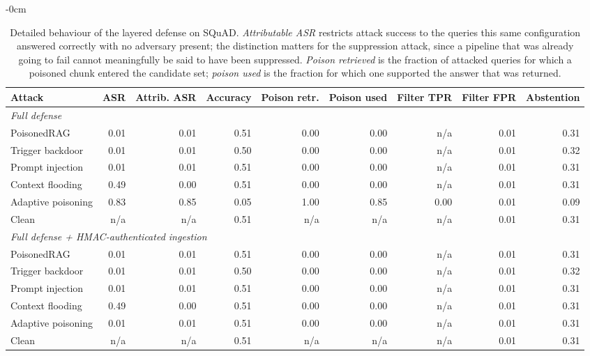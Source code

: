 \begin{table}[t]
\begin{adjustwidth}{-\extralength}{0cm}
\footnotesize
\setlength{\tabcolsep}{3pt}
\caption{Detailed behaviour of the layered defense on SQuAD. \emph{Attributable ASR} restricts attack success to the queries this same configuration answered correctly with no adversary present; the distinction matters for the suppression attack, since a pipeline that was already going to fail cannot meaningfully be said to have been suppressed. \emph{Poison retrieved} is the fraction of attacked queries for which a poisoned chunk entered the candidate set; \emph{poison used} is the fraction for which one supported the answer that was returned.\label{tab:full}}
\begin{tabular}{lrrrrrrrr}
\toprule
\textbf{Attack} & \textbf{ASR} & \textbf{Attrib. ASR} & \textbf{Accuracy} & \textbf{Poison retr.} & \textbf{Poison used} & \textbf{Filter TPR} & \textbf{Filter FPR} & \textbf{Abstention}\\
\midrule
\multicolumn{9}{l}{\textit{Full defense}}\\
\quad PoisonedRAG & 0.01 & 0.01 & 0.51 & 0.00 & 0.00 & n/a & 0.01 & 0.31\\
\quad Trigger backdoor & 0.01 & 0.01 & 0.50 & 0.00 & 0.00 & n/a & 0.01 & 0.32\\
\quad Prompt injection & 0.01 & 0.01 & 0.51 & 0.00 & 0.00 & n/a & 0.01 & 0.31\\
\quad Context flooding & 0.49 & 0.00 & 0.51 & 0.00 & 0.00 & n/a & 0.01 & 0.31\\
\quad Adaptive poisoning & 0.83 & 0.85 & 0.05 & 1.00 & 0.85 & 0.00 & 0.01 & 0.09\\
\quad Clean & n/a & n/a & 0.51 & n/a & n/a & n/a & 0.01 & 0.31\\
\multicolumn{9}{l}{\textit{Full defense + HMAC-authenticated ingestion}}\\
\quad PoisonedRAG & 0.01 & 0.01 & 0.51 & 0.00 & 0.00 & n/a & 0.01 & 0.31\\
\quad Trigger backdoor & 0.01 & 0.01 & 0.50 & 0.00 & 0.00 & n/a & 0.01 & 0.32\\
\quad Prompt injection & 0.01 & 0.01 & 0.51 & 0.00 & 0.00 & n/a & 0.01 & 0.31\\
\quad Context flooding & 0.49 & 0.00 & 0.51 & 0.00 & 0.00 & n/a & 0.01 & 0.31\\
\quad Adaptive poisoning & 0.01 & 0.01 & 0.51 & 0.00 & 0.00 & n/a & 0.01 & 0.31\\
\quad Clean & n/a & n/a & 0.51 & n/a & n/a & n/a & 0.01 & 0.31\\
\bottomrule
\end{tabular}
\end{adjustwidth}
\end{table}
